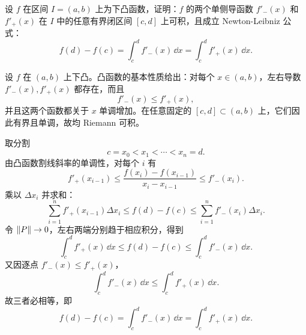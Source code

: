 \begin{xreferenceproblem}[4]
设 $f$ 在区间 $I=(a,b)$ 上为下凸函数，证明：$f$ 的两个单侧导函数 $f'_-(x)$ 和 $f'_+(x)$ 在 $I$ 中的任意有界闭区间 $[c,d]$ 上可积，且成立 Newton-Leibniz 公式：
\[
  f(d)-f(c)=\int_c^d f'_-(x)\,\dd x=\int_c^d f'_+(x)\,\dd x.
\]
\end{xreferenceproblem}
\begin{xsolution}
设 $f$ 在 $(a,b)$ 上下凸。凸函数的基本性质给出：对每个 $x\in(a,b)$，左右导数 $f'_-(x),f'_+(x)$ 都存在，而且
\[
  f'_-(x)\leqslant f'_+(x),
\]
并且这两个函数都关于 $x$ 单调增加。在任意固定的 $[c,d]\subset(a,b)$ 上，它们因此有界且单调，故均 Riemann 可积。

取分割
\[
  c=x_0<x_1<\cdots<x_n=d.
\]
由凸函数割线斜率的单调性，对每个 $i$ 有
\[
  f'_+(x_{i-1})
  \leqslant
  \frac{f(x_i)-f(x_{i-1})}{x_i-x_{i-1}}
  \leqslant f'_-(x_i).
\]
乘以 $\Delta x_i$ 并求和：
\[
  \sum_{i=1}^n f'_+(x_{i-1})\Delta x_i
  \leqslant f(d)-f(c)
  \leqslant
  \sum_{i=1}^n f'_-(x_i)\Delta x_i.
\]
令 $\lVert P\rVert\to0$，左右两端分别趋于相应积分，得到
\[
  \int_c^d f'_+(x)\,\dd x
  \leqslant f(d)-f(c)
  \leqslant
  \int_c^d f'_-(x)\,\dd x.
\]
又因逐点 $f'_-(x)\leqslant f'_+(x)$，
\[
  \int_c^d f'_-(x)\,\dd x
  \leqslant\int_c^d f'_+(x)\,\dd x.
\]
故三者必相等，即
\[
  \boxed{f(d)-f(c)=\int_c^d f'_-(x)\,\dd x
  =\int_c^d f'_+(x)\,\dd x}.
\]
\end{xsolution}


